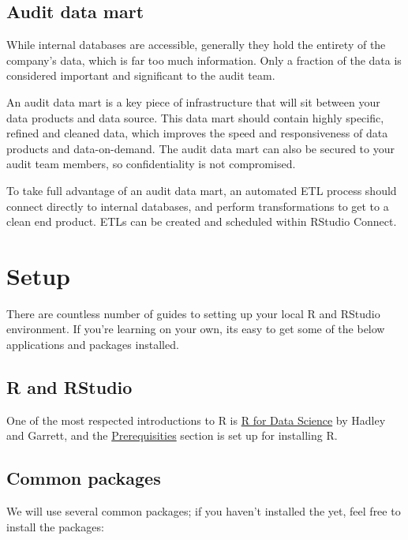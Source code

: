 \documentclass[
]{book}
\begin{document}
\hypertarget{audit-data-mart}{%
\section{Audit data mart}\label{audit-data-mart}}

While internal databases are accessible, generally they hold the entirety of the company's data, which is far too much information. Only a fraction of the data is considered important and significant to the audit team.

An audit data mart is a key piece of infrastructure that will sit between your data products and data source. This data mart should contain highly specific, refined and cleaned data, which improves the speed and responsiveness of data products and data-on-demand. The audit data mart can also be secured to your audit team members, so confidentiality is not compromised.

To take full advantage of an audit data mart, an automated ETL process should connect directly to internal databases, and perform transformations to get to a clean end product. ETLs can be created and scheduled within RStudio Connect.

\hypertarget{setup}{%
\chapter{Setup}\label{setup}}

There are countless number of guides to setting up your local R and RStudio environment. If you're learning on your own, its easy to get some of the below applications and packages installed.

\hypertarget{r-and-rstudio}{%
\section{R and RStudio}\label{r-and-rstudio}}

One of the most respected introductions to R is \href{https://r4ds.had.co.nz/introduction.html}{R for Data Science} by Hadley and Garrett, and the \href{https://r4ds.had.co.nz/introduction.html\#prerequisites}{Prerequisities} section is set up for installing R.

\hypertarget{common-packages}{%
\section{Common packages}\label{common-packages}}

We will use several common packages; if you haven't installed the yet, feel free to install the packages:
\end{document}

